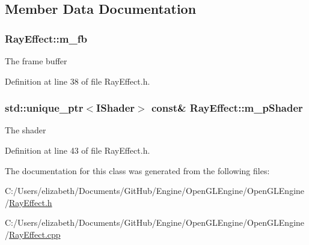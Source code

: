 \subsection{Member Data Documentation}
\subsubsection[{\texorpdfstring{m\+\_\+fb}{m_fb}}]{ Ray\+Effect\+::m\+\_\+fb\hspace{0.3cm}{\ttfamily [private]}}\hypertarget{class_ray_effect_a4e83685c236058fe810d67fe40387bd8}{}\label{class_ray_effect_a4e83685c236058fe810d67fe40387bd8}


The frame buffer 



Definition at line 38 of file Ray\+Effect.\+h.

\subsubsection[{\texorpdfstring{m\+\_\+p\+Shader}{m_pShader}}]{\setlength{\rightskip}{0pt plus 5cm}std\+::unique\+\_\+ptr$<${\bf I\+Shader}$>$ const\& Ray\+Effect\+::m\+\_\+p\+Shader\hspace{0.3cm}{\ttfamily [private]}}\hypertarget{class_ray_effect_a8633b843d8f014110b994465eb8a2590}{}\label{class_ray_effect_a8633b843d8f014110b994465eb8a2590}


The shader 



Definition at line 43 of file Ray\+Effect.\+h.



The documentation for this class was generated from the following files\+:\begin{DoxyCompactItemize}
\item 
C\+:/\+Users/elizabeth/\+Documents/\+Git\+Hub/\+Engine/\+Open\+G\+L\+Engine/\+Open\+G\+L\+Engine/\hyperlink{_ray_effect_8h}{Ray\+Effect.\+h}\item 
C\+:/\+Users/elizabeth/\+Documents/\+Git\+Hub/\+Engine/\+Open\+G\+L\+Engine/\+Open\+G\+L\+Engine/\hyperlink{_ray_effect_8cpp}{Ray\+Effect.\+cpp}\end{DoxyCompactItemize}
